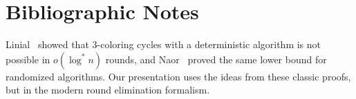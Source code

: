 \section{Bibliographic Notes}

Linial~\cite{linial92locality} showed that $3$-coloring cycles with a deterministic algorithm is not possible in $o(\log^* n)$ rounds, and Naor~\cite{Naor1991} proved the same lower bound for randomized algorithms. Our presentation uses the ideas from these classic proofs, but in the modern round elimination formalism.


